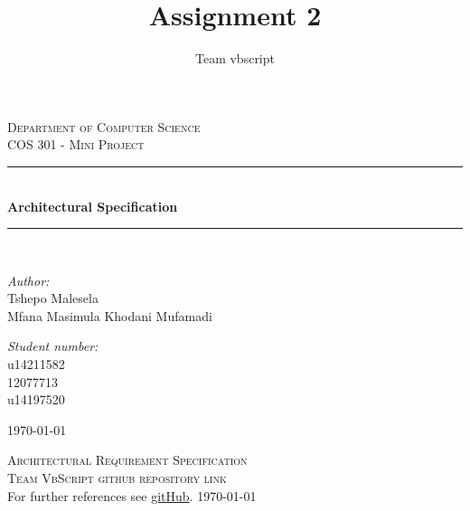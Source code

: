 \documentclass[a4paper,12pt]{report}
\author{Team vbscript}
\title{ Assignment 2}
\newcommand{\HRule}{\rule{\linewidth}{0.5mm}}
\begin{document}
\setlength{\parskip}{6pt}

\begin{titlepage}

\begin{center}
  
\textsc{\LARGE Department of Computer Science}\\[1.5cm]
\textsc{\Large COS 301 - Mini Project}\\[0.5cm]
\HRule \\[0.4cm]
{ \huge \bfseries Architectural Specification}\\[0.4cm]
\HRule \\[0.4cm]
\begin{minipage}{0.4\textwidth}
\begin{flushleft} \large
\emph{Author:}\\
Tshepo {Malesela}\\
Mfana Masimula
Khodani Mufamadi
\end{flushleft}
\end{minipage}
\begin{minipage}{0.4\textwidth}
\begin{flushright} \large
\emph{Student number:} \\
u14211582\\
12077713\\
u14197520
\end{flushright}
\end{minipage}

\vfill

{\large \today}
\end{center}
\end{titlepage}
\footnotesize
\normalsize

\renewcommand{\thesection}{\arabic{section}}

\begin{center}
\tableofcontents
\footnotesize
\normalsize  
\end{center}

\renewcommand{\thesection}{\arabic{section}}
\newpage
\begin{center}
	\textsc{\LARGE Architectural Requirement Specification}\\[1.5cm]
	\textsc{\Large Team VbScript github repository link}\\[0.5cm]
	For further references see \href{https://github.com/mfanamasimula/VBScript}{gitHub}.
	\today
\end{center}
\newpage
\end{document}
